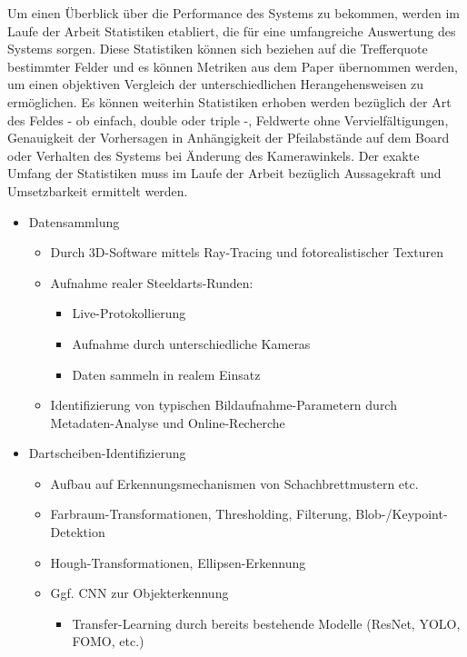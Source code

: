 Um einen Überblick über die Performance des Systems zu bekommen, werden im Laufe der Arbeit Statistiken etabliert, die für eine umfangreiche Auswertung des Systems sorgen. Diese Statistiken können sich beziehen auf die Trefferquote bestimmter Felder und es können Metriken aus dem Paper übernommen werden, um einen objektiven Vergleich der unterschiedlichen Herangehensweisen zu ermöglichen. Es können weiterhin Statistiken erhoben werden bezüglich der Art des Feldes - ob einfach, double oder triple -, Feldwerte ohne Vervielfältigungen, Genauigkeit der Vorhersagen in Anhängigkeit der Pfeilabstände auf dem Board oder Verhalten des Systems bei Änderung des Kamerawinkels. Der exakte Umfang der Statistiken muss im Laufe der Arbeit bezüglich Aussagekraft und Umsetzbarkeit ermittelt werden.

\iffalse
\begin{itemize}
    \item Datensammlung
    \begin{itemize}
        \raggedright
        \item Durch 3D-Software mittels Ray-Tracing und fotorealistischer Texturen
        \item Aufnahme realer Steeldarts-Runden:
        \begin{itemize}
            \item Live-Protokollierung
            \item Aufnahme durch unterschiedliche Kameras
            \item Daten sammeln in realem Einsatz
        \end{itemize}
        \item Identifizierung von typischen Bildaufnahme-Parametern durch Metadaten-Analyse und Online-Recherche
    \end{itemize}

    \item Dartscheiben-Identifizierung
    \begin{itemize}
        \raggedright
        \item Aufbau auf Erkennungsmechanismen von Schachbrettmustern etc.
        \item Farbraum-Transformationen, Thresholding, Filterung, Blob-/Keypoint-Detektion
        \item Hough-Transformationen, Ellipsen-Erkennung
        \item Ggf. CNN zur Objekterkennung
        \begin{itemize}
            \item Transfer-Learning durch bereits bestehende Modelle (ResNet, YOLO, FOMO, etc.)
        \end{itemize}
    \end{itemize}


\end{itemize}
